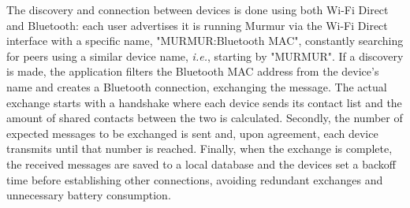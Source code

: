 The discovery and connection between devices is done using both Wi-Fi Direct and Bluetooth: each user advertises it is running Murmur via the Wi-Fi Direct interface with a specific name, "MURMUR:Bluetooth MAC", constantly searching for peers using a similar device name, \textit{i.e.}, starting by "MURMUR". If a discovery is made, the application filters the Bluetooth \gls{MAC} address from the device's name and creates a Bluetooth connection, exchanging the message. The actual exchange starts with a handshake where each device sends its contact list and the amount of shared contacts between the two is calculated. Secondly, the number of expected messages to be exchanged is sent and, upon agreement, each device transmits until that number is reached. Finally, when the exchange is complete, the received messages are saved to a local database and the devices set a backoff time before establishing other connections, avoiding redundant exchanges and unnecessary battery consumption.











